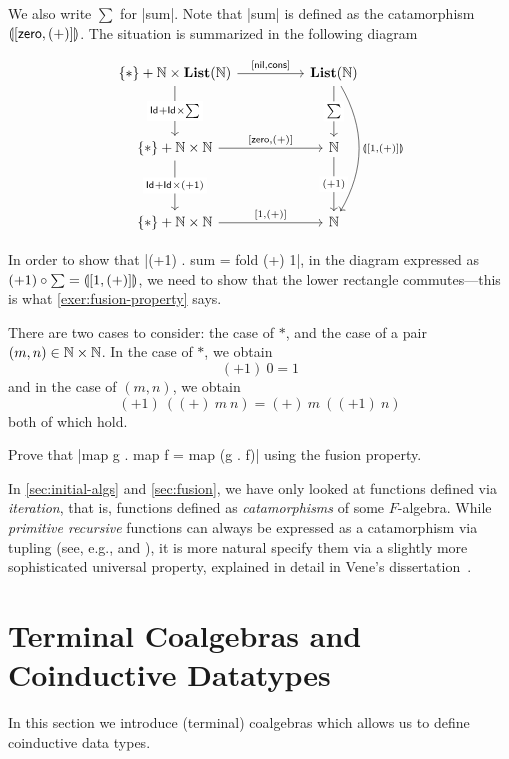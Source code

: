 \begin{solution}
  We also write $\sum$ for |sum|. Note that |sum| is defined as the catamorphism $\llparenthesis [\mathsf{zero}, (+)] \rrparenthesis$.
  The situation is summarized in the following diagram
  
  \[
    \begin{tikzcd}[row sep = huge, column sep = huge]
      \{*\} + \NN \times \List(\NN)
      \ar[d, "\Id + \Id \times \sum" description]
      \ar[r, "{[\nil, \cons]}"]
      &
      \List(\NN)
      \ar[d, "\sum" description]
      \ar[dd, bend left, "\catam{[1, (+)]}"]
      \\
      \{*\} + \NN \times \NN
      \ar[r, "{[\Zero, (+)]}"]
      \ar[d, "{\Id + \Id \times (+1)}" description]
      &
      \NN
      \ar[d, "{(+1)}" description]
      \\
      \{*\} + \NN \times \NN
      \ar[r, "{[1, (+)]}"]
      &
      \NN 
    \end{tikzcd}
  \]

  In order to show that |(+1) . sum = fold (+) 1|, in the diagram expressed as $(+1) \circ \sum = \llparenthesis [1, (+)] \rrparenthesis$, we need to show that the lower rectangle commutes---this is what  \cref{exer:fusion-property} says.

  There are two cases to consider: the case of $*$, and the case of a pair $(m,n) \in \mathbb{N}\times\mathbb{N}$.
  In the case of $*$, we obtain
  \[
    (+1)~0 = 1
  \]
  and in the case of $(m,n)$, we obtain
  \[
    (+1)~ ((+)~ m~ n) = (+)~ m~ ((+1)~n)
  \]
  both of which hold.
  
\end{solution}

\begin{exer}
  Prove that |map g . map f = map (g . f)| using the fusion property.
\end{exer}


\begin{reading*}
  In \cref{sec:initial-algs} and \cref{sec:fusion}, we have only looked at functions defined via \emph{iteration}, that is, functions defined as \emph{catamorphisms} of some $F$-algebra.
  While \emph{primitive recursive} functions can always be expressed as a catamorphism via tupling (see, e.g., \cite[\S4]{DBLP:journals/jfp/Hutton99} and \cite[\S3.1]{vene_phd}), it is more natural specify them via a slightly more sophisticated universal property, explained in detail in Vene's dissertation~\cite[Chapter~3]{vene_phd}.
\end{reading*}

\section{Terminal Coalgebras and Coinductive Datatypes}
In this section we introduce (terminal) coalgebras which allows us to define coinductive data types.

